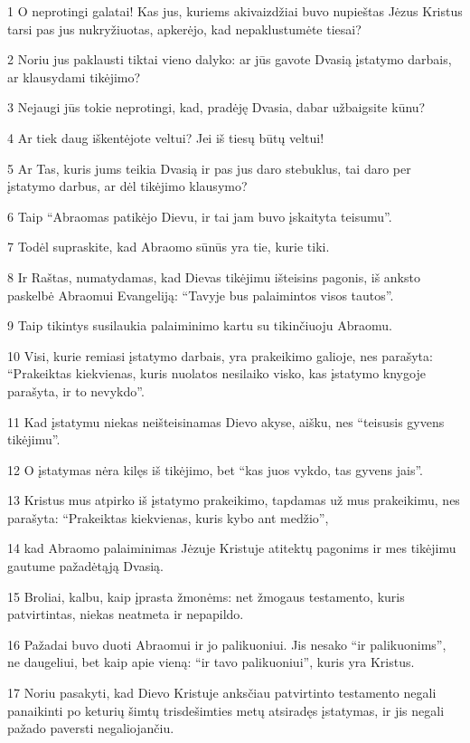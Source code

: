 \par 1 O neprotingi galatai! Kas jus, kuriems akivaizdžiai buvo nupieštas Jėzus Kristus tarsi pas jus nukryžiuotas, apkerėjo, kad nepaklustumėte tiesai? 
\par 2 Noriu jus paklausti tiktai vieno dalyko: ar jūs gavote Dvasią įstatymo darbais, ar klausydami tikėjimo? 
\par 3 Nejaugi jūs tokie neprotingi, kad, pradėję Dvasia, dabar užbaigsite kūnu? 
\par 4 Ar tiek daug iškentėjote veltui? Jei iš tiesų būtų veltui! 
\par 5 Ar Tas, kuris jums teikia Dvasią ir pas jus daro stebuklus, tai daro per įstatymo darbus, ar dėl tikėjimo klausymo? 
\par 6 Taip “Abraomas patikėjo Dievu, ir tai jam buvo įskaityta teisumu”. 
\par 7 Todėl supraskite, kad Abraomo sūnūs yra tie, kurie tiki. 
\par 8 Ir Raštas, numatydamas, kad Dievas tikėjimu išteisins pagonis, iš anksto paskelbė Abraomui Evangeliją: “Tavyje bus palaimintos visos tautos”. 
\par 9 Taip tikintys susilaukia palaiminimo kartu su tikinčiuoju Abraomu. 
\par 10 Visi, kurie remiasi įstatymo darbais, yra prakeikimo galioje, nes parašyta: “Prakeiktas kiekvienas, kuris nuolatos nesilaiko visko, kas įstatymo knygoje parašyta, ir to nevykdo”. 
\par 11 Kad įstatymu niekas neišteisinamas Dievo akyse, aišku, nes “teisusis gyvens tikėjimu”. 
\par 12 O įstatymas nėra kilęs iš tikėjimo, bet “kas juos vykdo, tas gyvens jais”. 
\par 13 Kristus mus atpirko iš įstatymo prakeikimo, tapdamas už mus prakeikimu, nes parašyta: “Prakeiktas kiekvienas, kuris kybo ant medžio”,­ 
\par 14 kad Abraomo palaiminimas Jėzuje Kristuje atitektų pagonims ir mes tikėjimu gautume pažadėtąją Dvasią. 
\par 15 Broliai, kalbu, kaip įprasta žmonėms: net žmogaus testamento, kuris patvirtintas, niekas neatmeta ir nepapildo. 
\par 16 Pažadai buvo duoti Abraomui ir jo palikuoniui. Jis nesako “ir palikuonims”, ne daugeliui, bet kaip apie vieną: “ir tavo palikuoniui”, kuris yra Kristus. 
\par 17 Noriu pasakyti, kad Dievo Kristuje anksčiau patvirtinto testamento negali panaikinti po keturių šimtų trisdešimties metų atsiradęs įstatymas, ir jis negali pažado paversti negaliojančiu. 
